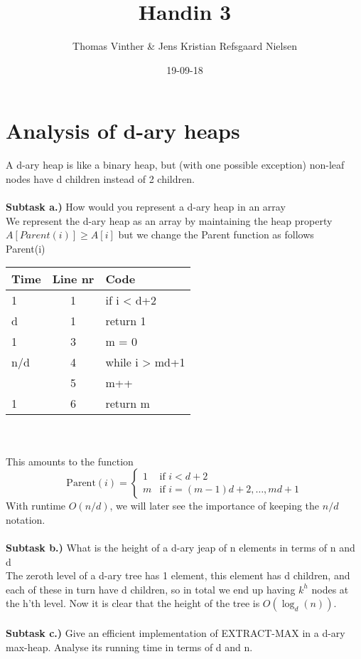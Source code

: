 \documentclass{article}
\theoremstyle{remark}
\numberwithin{equation}{section}
\begin{document}
	\author{Thomas Vinther \& Jens Kristian Refsgaard Nielsen}
	\title{Handin 3}
	\date{19-09-18}
	\maketitle
\section*{Analysis of d-ary heaps}
A d-ary heap is like a binary heap, but (with one possible exception) non-leaf nodes have d children instead of 2 children.\\\\
\textbf{Subtask a.)} How would you represent a d-ary heap in an array\\
We represent the d-ary heap as an array by maintaining the heap property $A[Parent(i)] \geq A[i]$ but we change the Parent function as follows
\\Parent(i)
\\\begin{tabular}{l | c | l}
	Time & Line nr & Code \\ \hline
	1 & 1 & if i < d+2 \\
	\indent d & 1 & \indent return 1 \\
	1 & 3 & m = 0 \\
	n/d & 4 & while i > md+1\\
	\indent 1 & 5 & \indent m++ \\
	1 & 6 & return m 
\end{tabular}\\\\
This amounts to the function
\begin{equation}
	\text{Parent}(i) = \begin{cases}
	1 & \text{if }i<d+2\\
	m & \text{if }i=(m-1)d+2,\dots,md+1
	\end{cases}
\end{equation}
With runtime $O(n/d)$, we will later see the importance of keeping the $n/d$ notation.
\\\\\textbf{Subtask b.)} What is the height of a d-ary jeap of n elements in terms of n and d
\\The zeroth level of a d-ary tree has 1 element, this element has d children, and each of these in turn have d children, so in total we end up having $k^h$ nodes at the h'th level. Now it is clear that the height of the tree is $O(\log_d(n))$.
\\\\\textbf{Subtask c.)} Give an efficient implementation of EXTRACT-MAX in a d-ary max-heap. Analyse its running time in terms of d and n.
\end{document}
